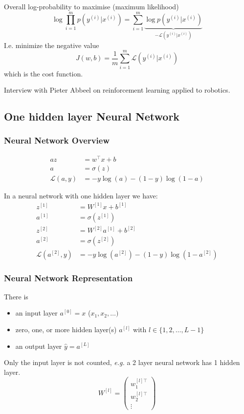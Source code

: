 \documentclass{article}
\begin{document}
Overall log-probability to maximise (maximum likelihood)
\begin{equation}
  \log\prod_{i=1}^m p(y^{(i)}|x^{(i)})=\sum_{i=1}^m \underbrace{\log p(y^{(i)}|x^{(i)})}_{-\mathcal{L}(y^{(i)}|x^{(i)})}
\end{equation}
I.e. minimize the negative value
\begin{equation}
  J(w,b)=\frac{1}{m}\sum_{i=1}^m \mathcal{L}(y^{(i)}|x^{(i)})
\end{equation}
which is the cost function.

Interview with Pieter Abbeel on reinforcement learning applied to robotics.

\subsection{One hidden layer Neural Network}
\subsubsection{Neural Network Overview}
\begin{equation}
  \begin{split}a
    z&=w^\top x+b\\
    a&=\sigma(z)\\
    \mathcal{L}(a,y)&=-y\log(a)-(1-y)\log(1-a)
  \end{split}
\end{equation}

In a neural network with one hidden layer we have:
\begin{equation}
  \begin{split}
    z^{[1]}&=W^{[1]}x+b^{[1]}\\
    a^{[1]}&=\sigma(z^{[1]})\\
    z^{[2]}&=W^{[2]}a^{[1]}+b^{[2]}\\
    a^{[2]}&=\sigma(z^{[2]})\\
    \mathcal{L}(a^{[2]},y)&=-y\log(a^{[2]})-(1-y)\log(1-a^{[2]})
  \end{split}
\end{equation}

\subsubsection{Neural Network Representation}
There is
\begin{itemize}
  \item an input layer $a^{[0]}=x$ ($x_1, x_2, \ldots)$
  \item zero, one, or more hidden layer(s) $a^{[l]}$ with $l\in\{1,2,\ldots,L-1\}$
  \item an output layer $\hat{y}=a^{[L]}$
\end{itemize}
Only the input layer is not counted, \emph{e.g.} a 2 layer neural network has 1 hidden layer.
\begin{equation}
  W^{[l]}=
  \begin{pmatrix}
  w^{[l]\top}_1\\
  w^{[l]\top}_2\\
  \vdots
  \end{pmatrix}
\end{equation}
\end{document}
